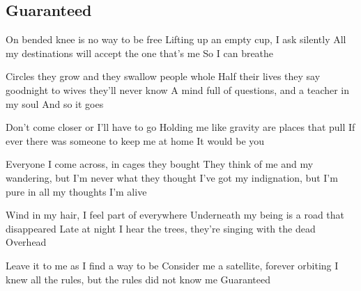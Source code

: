 \subsection*{Guaranteed   }



\begin{guitar}

On bended knee is no way to be free
Lifting up an empty cup, I ask silently
All my destinations will accept the one that's me
So I can breathe

Circles they grow and they swallow people whole
Half their lives they say goodnight to wives they'll never know
A mind full of questions, and a teacher in my soul
And so it goes

Don't come closer or I'll have to go
Holding me like gravity are places that pull
If ever there was someone to keep me at home
It would be you

Everyone I come across, in cages they bought
They think of me and my wandering, but I'm never what they thought
I've got my indignation, but I'm pure in all my thoughts
I'm alive

Wind in my hair, I feel part of everywhere
Underneath my being is a road that disappeared
Late at night I hear the trees, they're singing with the dead
Overhead

Leave it to me as I find a way to be
Consider me a satellite, forever orbiting
I knew all the rules, but the rules did not know me
Guaranteed

\end{guitar}
